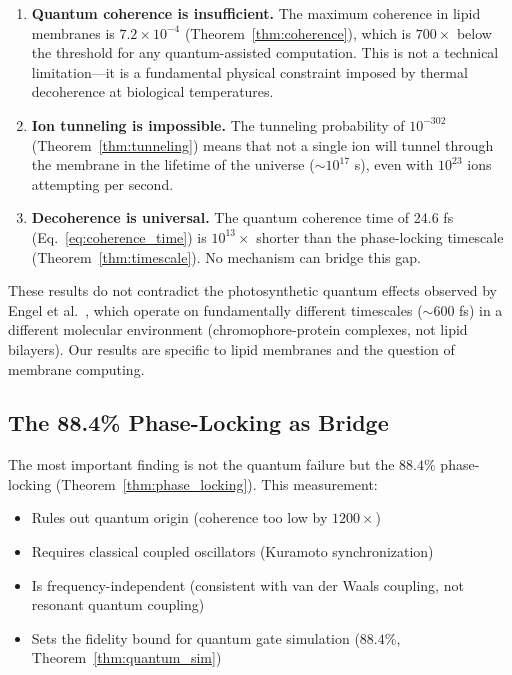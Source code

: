 \documentclass[12pt]{article}
\theoremstyle{definition}
\theoremstyle{remark}
\begin{document}
\begin{enumerate}[leftmargin=2em]
    \item \textbf{Quantum coherence is insufficient.} The maximum coherence in lipid membranes is $7.2 \times 10^{-4}$ (Theorem~\ref{thm:coherence}), which is $700\times$ below the threshold for any quantum-assisted computation. This is not a technical limitation---it is a fundamental physical constraint imposed by thermal decoherence at biological temperatures.

    \item \textbf{Ion tunneling is impossible.} The tunneling probability of $10^{-302}$ (Theorem~\ref{thm:tunneling}) means that not a single ion will tunnel through the membrane in the lifetime of the universe ($\sim 10^{17}$ s), even with $10^{23}$ ions attempting per second.

    \item \textbf{Decoherence is universal.} The quantum coherence time of 24.6 fs (Eq.~\ref{eq:coherence_time}) is $10^{13}\times$ shorter than the phase-locking timescale (Theorem~\ref{thm:timescale}). No mechanism can bridge this gap.
\end{enumerate}

These results do not contradict the photosynthetic quantum effects observed by Engel et al.~\citep{engel2007evidence}, which operate on fundamentally different timescales ($\sim 600$ fs) in a different molecular environment (chromophore-protein complexes, not lipid bilayers). Our results are specific to lipid membranes and the question of membrane computing.

\subsection{The 88.4\% Phase-Locking as Bridge}

The most important finding is not the quantum failure but the $88.4\%$ phase-locking (Theorem~\ref{thm:phase_locking}). This measurement:
\begin{itemize}[leftmargin=2em]
    \item Rules out quantum origin (coherence too low by $1200\times$)
    \item Requires classical coupled oscillators (Kuramoto synchronization)
    \item Is frequency-independent (consistent with van der Waals coupling, not resonant quantum coupling)
    \item Sets the fidelity bound for quantum gate simulation ($88.4\%$, Theorem~\ref{thm:quantum_sim})
\end{itemize}
\end{document}
